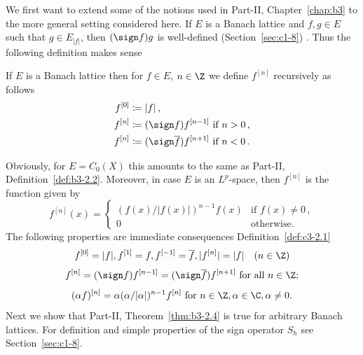 We first want to extend some of the notions used in Part-II, Chapter~\ref{chap:b3} to the more general setting considered here.
If\/ $E$ is a Banach lattice and $f,g \in E$ such that $g \in E_{|f|}$, then $(\sign  f)g$ is well-defined (\cf Section~\ref{sec:c1-8})%
.
Thus the following definition makes sense
\begin{definition}\label{def:c3-2.1}
	If\/ $E$ is a Banach lattice then for $f \in E$, $n \in \Z$ we define $f^{[n]}$ recursively as follows
	\begin{equation}\label{eq:c3-2.1}
	\begin{split}
		f^{[0]} &\coloneqq |f|\,, \\
		f^{[n]} &\coloneqq (\sign  f)f^{[n-1]} \text{ if } n > 0\,,\\
		f^{[n]} &\coloneqq (\sign  \overline{f})f^{[n+1]} \text{ if } n < 0\,.
	\end{split}
	\end{equation}
\end{definition}
Obviously, for $E = C_{0}(X)$ this amounts to the same as Part-II, Definition~\ref{def:b3-2.2}.
Moreover, in case $E$ is an $L^p$-space, then $f^{[n]}$ is the function given by
\begin{equation}\label{eq:c3-2.2}
	f^{[n]}(x) = \begin{cases}
		(f(x)/|f(x)|)^{n-1}f(x) & \text{if } f(x) \neq 0\,, \\
		0 & \text{otherwise}.
	\end{cases}
\end{equation}
The following properties are immediate consequences Definition~\ref{def:c3-2.1}
\begin{equation}\label{eq:c3-2.3}
	f^{[0]} = |f|, f^{[1]} = f, f^{[-1]} = \overline{f}, |f^{[n]}| = |f| \quad (n \in \Z)
\end{equation}
\begin{equation}\label{eq:c3-2.4}
	f^{[n]} = (\sign  f)f^{[n-1]} = (\sign  \overline{f})f^{[n+1]} \text{ for all } n \in \Z;
\end{equation}
\begin{equation}\label{eq:c3-2.5}
	(\alpha f)^{[n]} = \alpha(\alpha/|\alpha|)^{n-1}f^{[n]} \text{ for } n \in \Z, \alpha \in \C , \alpha \neq 0.
\end{equation}
Next we show that Part-II, Theorem~\ref{thm:b3-2.4} is true for arbitrary Banach lattices.
For definition and simple properties of the sign operator $S_{h}$ see Section~\ref{sec:c1-8}.

